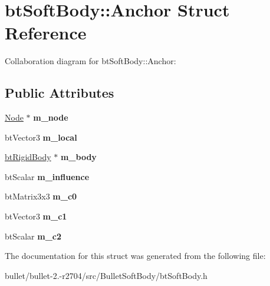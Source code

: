 \hypertarget{structbt_soft_body_1_1_anchor}{\section{bt\+Soft\+Body\+:\+:Anchor Struct Reference}
\label{structbt_soft_body_1_1_anchor}
}


Collaboration diagram for bt\+Soft\+Body\+:\+:Anchor\+:
\subsection*{Public Attributes}
\begin{DoxyCompactItemize}
\item 
\hypertarget{structbt_soft_body_1_1_anchor_abc1bf9b55ed97026448d561a3fee9d8b}{\hyperlink{structbt_soft_body_1_1_node}{Node} $\ast$ {\bfseries m\+\_\+node}}\label{structbt_soft_body_1_1_anchor_abc1bf9b55ed97026448d561a3fee9d8b}

\item 
\hypertarget{structbt_soft_body_1_1_anchor_a06d5ececcb7018b282039a82f5061e4a}{bt\+Vector3 {\bfseries m\+\_\+local}}\label{structbt_soft_body_1_1_anchor_a06d5ececcb7018b282039a82f5061e4a}

\item 
\hypertarget{structbt_soft_body_1_1_anchor_a232e889f1d84f32b4f8d54d24baa1b18}{\hyperlink{classbt_rigid_body}{bt\+Rigid\+Body} $\ast$ {\bfseries m\+\_\+body}}\label{structbt_soft_body_1_1_anchor_a232e889f1d84f32b4f8d54d24baa1b18}

\item 
\hypertarget{structbt_soft_body_1_1_anchor_a05a862b5fb1fe7d56ff50ff527f7beaf}{bt\+Scalar {\bfseries m\+\_\+influence}}\label{structbt_soft_body_1_1_anchor_a05a862b5fb1fe7d56ff50ff527f7beaf}

\item 
\hypertarget{structbt_soft_body_1_1_anchor_ad3928469ff917d5c03bbbbb1192026e5}{bt\+Matrix3x3 {\bfseries m\+\_\+c0}}\label{structbt_soft_body_1_1_anchor_ad3928469ff917d5c03bbbbb1192026e5}

\item 
\hypertarget{structbt_soft_body_1_1_anchor_a0570748f1978b7ab7cd6cc30eb5f6715}{bt\+Vector3 {\bfseries m\+\_\+c1}}\label{structbt_soft_body_1_1_anchor_a0570748f1978b7ab7cd6cc30eb5f6715}

\item 
\hypertarget{structbt_soft_body_1_1_anchor_a4cd6a20a7e31d879e510ffe6ff076537}{bt\+Scalar {\bfseries m\+\_\+c2}}\label{structbt_soft_body_1_1_anchor_a4cd6a20a7e31d879e510ffe6ff076537}

\end{DoxyCompactItemize}


The documentation for this struct was generated from the following file\+:\begin{DoxyCompactItemize}
\item 
bullet/bullet-\/2.-\/r2704/src/\+Bullet\+Soft\+Body/bt\+Soft\+Body.\+h\end{DoxyCompactItemize}
